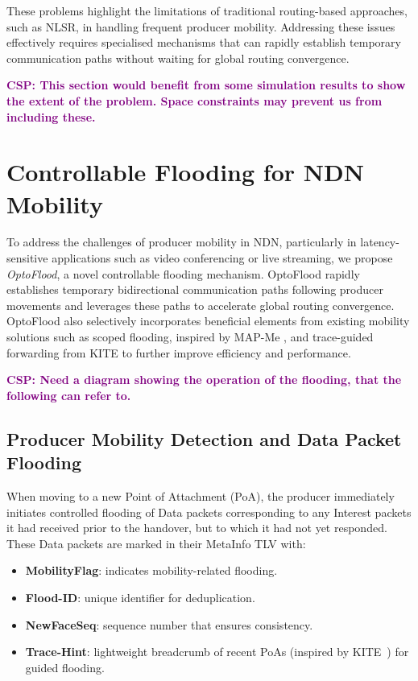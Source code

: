 \documentclass[10pt,conference]{IEEEtran}
\newcommand{\csp}[1]{\textbf{\textcolor{purple}{CSP: #1}}}
\begin{document}
These problems highlight the limitations of traditional routing-based approaches, such as NLSR, in handling frequent producer mobility. Addressing these issues effectively requires specialised mechanisms that can rapidly establish temporary communication paths without waiting for global routing convergence.

\csp{This section would benefit from some simulation results to show the extent of the problem. Space constraints may prevent us from including these.}

\section{Controllable Flooding for NDN Mobility} 
\label{sec:solution}

To address the challenges of producer mobility in NDN, particularly in latency-sensitive applications such as video conferencing or live streaming, we propose \textit{OptoFlood}, a novel controllable flooding mechanism. OptoFlood rapidly establishes temporary bidirectional communication paths following producer movements and leverages these paths to accelerate global routing convergence.
OptoFlood also selectively incorporates beneficial elements from existing mobility solutions such as scoped flooding, inspired by MAP-Me \cite{FIXME}, and trace-guided forwarding from KITE \cite{FIXME} to further improve efficiency and performance.

\csp{Need a diagram showing the operation of the flooding, that the following can refer to.}

\subsection{Producer Mobility Detection and Data Packet Flooding}
\label{sec:solution:data-flooding}

When moving to a new Point of Attachment (PoA), the producer immediately initiates controlled flooding of Data packets corresponding to any Interest packets it had received prior to the handover, but to which it had not yet responded. These Data packets are marked in their MetaInfo TLV with:
\begin{itemize}
\item \textbf{MobilityFlag}: indicates mobility-related flooding.
\item \textbf{Flood-ID}: unique identifier for deduplication.
\item \textbf{NewFaceSeq}: sequence number that ensures consistency.
\item \textbf{Trace-Hint}: lightweight breadcrumb of recent PoAs (inspired by KITE~\cite{zhang:2018:kite}) for guided flooding.
\end{itemize}
\end{document}
